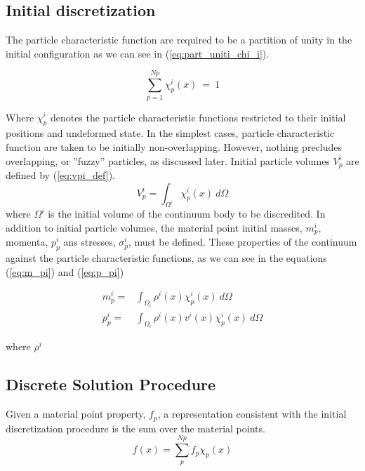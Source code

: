 \message{ !name(../../../mpm.tex)}\documentclass[10pt,a4paper]{article}
\begin{document}
\subsection{Initial discretization}
\label{sec:ini_discr}

The particle characteristic function are required to be a partition of
unity in the initial configuration as we can see in
(\ref{eq:part_uniti_chi_i}).

\begin{equation}
  \label{eq:part_uniti_chi_i}
  \sum_{p=1}^{Np}\chi_p^i(x)\ =\ 1
\end{equation}

Where $\chi_p^i$ denotes the particle characteristic functions
restricted to their initial positions and undeformed state. In the
simplest cases, particle characteristic function are taken to be
initially non-overlapping. However, nothing precludes overlapping, or
''fuzzy'' particles, as discussed later. Initial particle volumes
$V_p^i$ are defined by (\ref{eq:vpi_def}).
\begin{equation}
  \label{eq:vpi_def}
  V_p^i = \int_{\Omega^i}\chi^i_p(x)\ d\Omega
\end{equation}
where $\Omega^i$ is the initial volume of the continuum body to be
discredited. In addition to initial particle volumes, the material
point initial masses, $m_p^i$, momenta, $p_p^i$ ans stresses,
$\sigma_p^i$, must be defined. These properties of the continuum
against the particle characteristic functions, as we can see in the
equations (\ref{eq:m_pi}) and (\ref{eq:p_pi})

\begin{align}
  \label{eq:m_pi}
  m_p^i =& \int_{\Omega_i}\rho^i(x)\chi_p^i(x)\ d\Omega \\
  \label{eq:p_pi}
  p_p^i =& \int_{\Omega_i}\rho^i(x)v^i(x)\chi_p^i(x)\ d\Omega
\end{align}

where $\rho^i$

\subsection{Discrete Solution Procedure}
\label{sec:discr_sol_proc}

Given a material point property, $f_p$, a representation consistent
with the initial discretization procedure is the sum over the material
points.
\begin{equation}
  \label{eq:mat_point_discretiz}
  f(x) = \sum_p^{Np}f_p \chi_p(x)  
\end{equation}
\end{document}
